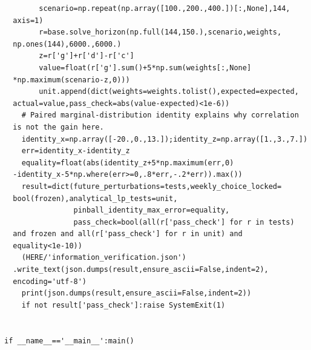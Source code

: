 \begin{verbatim}
        scenario=np.repeat(np.array([100.,200.,400.])[:,None],144,
  axis=1)
        r=base.solve_horizon(np.full(144,150.),scenario,weights,
  np.ones(144),6000.,6000.)
        z=r['g']+r['d']-r['c']
        value=float(r['g'].sum()+5*np.sum(weights[:,None]
  *np.maximum(scenario-z,0)))
        unit.append(dict(weights=weights.tolist(),expected=expected,
  actual=value,pass_check=abs(value-expected)<1e-6))
    # Paired marginal-distribution identity explains why correlation
  is not the gain here.
    identity_x=np.array([-20.,0.,13.]);identity_z=np.array([1.,3.,7.])
    err=identity_x-identity_z
    equality=float(abs(identity_z+5*np.maximum(err,0)
  -identity_x-5*np.where(err>=0,.8*err,-.2*err)).max())
    result=dict(future_perturbations=tests,weekly_choice_locked=
  bool(frozen),analytical_lp_tests=unit,
                pinball_identity_max_error=equality,
                pass_check=bool(all(r['pass_check'] for r in tests)
  and frozen and all(r['pass_check'] for r in unit) and
  equality<1e-10))
    (HERE/'information_verification.json')
  .write_text(json.dumps(result,ensure_ascii=False,indent=2),
  encoding='utf-8')
    print(json.dumps(result,ensure_ascii=False,indent=2))
    if not result['pass_check']:raise SystemExit(1)


if __name__=='__main__':main()
\end{verbatim}

